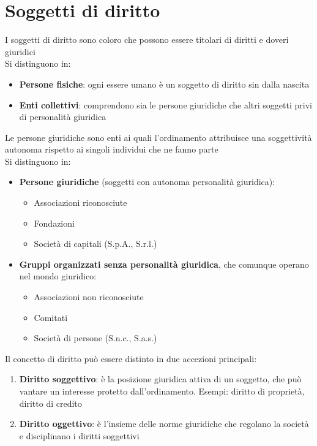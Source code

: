 \documentclass[10pt,oneside,a4paper]{article}
\begin{document}
	\section{Soggetti di diritto}
	I soggetti di diritto sono coloro che possono essere titolari di diritti e doveri giuridici\\
	Si distinguono in:  
	\begin{itemize}
		\item \textbf{Persone fisiche}: ogni essere umano è un soggetto di diritto sin dalla nascita
		\item \textbf{Enti collettivi}: comprendono sia le persone giuridiche che altri soggetti privi di personalità giuridica  
	\end{itemize}
	Le persone giuridiche sono enti ai quali l'ordinamento attribuisce una soggettività autonoma rispetto ai singoli individui che ne fanno parte\\
	Si distinguono in:  
	\begin{itemize}
		\item \textbf{Persone giuridiche} (soggetti con autonoma personalità giuridica):  
		\begin{itemize}
			\item Associazioni riconosciute  
			\item Fondazioni  
			\item Società di capitali (S.p.A., S.r.l.)  
		\end{itemize}
		\item \textbf{Gruppi organizzati senza personalità giuridica}, che comunque operano nel mondo giuridico:  
		\begin{itemize}
			\item Associazioni non riconosciute  
			\item Comitati  
			\item Società di persone (S.n.c., S.a.s.)  
		\end{itemize}
	\end{itemize}
	Il concetto di diritto può essere distinto in due accezioni principali:  
	\begin{enumerate}
		\item \textbf{Diritto soggettivo}: è la posizione giuridica attiva di un soggetto, che può vantare un interesse protetto dall'ordinamento. Esempi: diritto di proprietà, diritto di credito 
		\item \textbf{Diritto oggettivo}: è l'insieme delle norme giuridiche che regolano la società e disciplinano i diritti soggettivi
	\end{enumerate}
\end{document}
